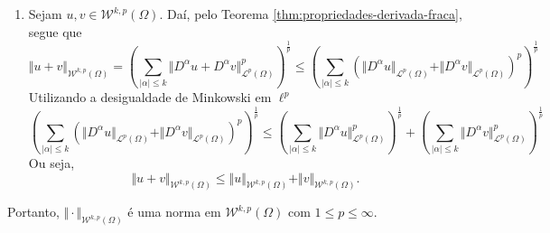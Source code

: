 \documentclass[a4paper, 11pt]{book}
\theoremstyle{definition}
\newcommand{\cL}{\mathcal{L}}
\newcommand{\cW}{\mathcal{W}}
\begin{document}
\begin{prf}
\begin{enumerate}[leftmargin=*]
        \item Sejam $u, v \in \cW^{k,p}(\Omega)$. Daí, pelo Teorema \ref{thm:propriedades-derivada-fraca}, segue que
        \[
            \Vert u + v \Vert_{\cW^{k,p}(\Omega)} = \left(\sum_{|\alpha| \leqslant k} \Vert D^\alpha u + D^\alpha v \Vert_{\cL^p(\Omega)}^p\right)^{\!\!\frac{1}{p}} \leqslant \left(\sum_{|\alpha| \leqslant k} \left(\Vert D^\alpha u \Vert_{\cL^p(\Omega)} + \Vert D^\alpha v \Vert_{\cL^p(\Omega)}\right)^p \right)^{\!\!\frac{1}{p}}
        \]
        Utilizando a desigualdade de Minkowski em $\ell^p$
        \[
            \left(\sum_{|\alpha| \leqslant k} \left(\Vert D^\alpha u \Vert_{\cL^p(\Omega)} + \Vert D^\alpha v \Vert_{\cL^p(\Omega)}\right)^p \right)^{\!\!\frac{1}{p}} \leqslant \left( \sum_{|\alpha| \leqslant k} \Vert D^\alpha u \Vert_{\cL^p(\Omega)}^p \right)^{\!\!\frac{1}{p}} + \left( \sum_{|\alpha| \leqslant k} \Vert D^\alpha v \Vert_{\cL^p(\Omega)}^p \right)^{\!\!\frac{1}{p}}
        \]
        Ou seja,
        \[
            \Vert u + v \Vert_{\cW^{k,p}(\Omega)} \leqslant \Vert u \Vert_{\cW^{k,p}(\Omega)} + \Vert v \Vert_{\cW^{k,p}(\Omega)}.
        \]
    \end{enumerate}
    Portanto, $\Vert \cdot \Vert_{\cW^{k,p}(\Omega)}$ é uma norma em $\cW^{k,p}(\Omega)$ com $1 \leqslant p \leqslant \infty$.
\end{prf}
\end{document}
